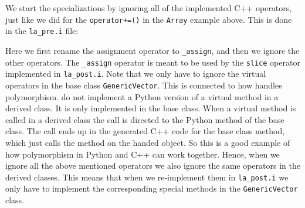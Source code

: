 We start the specializations by ignoring all of the implemented C++ operators, just like we did for the \texttt{operator+=()} in the \texttt{Array} example above. This is done in the \texttt{la\_pre.i} file:
\begin{c++}
\end{c++}
Here we first rename the assignment operator to \texttt{\_assign}, and then we ignore the other operators. The \texttt{\_assign} operator is meant to be used by the \texttt{slice} operator implemented in \texttt{la\_post.i}. Note that we only have to ignore the virtual operators in the base class \texttt{GenericVector}. This is connected to how \swig handles polymorphism. \swig do not implement a Python version of a virtual method in a derived class. It is only implemented in the base class. When a virtual method is called in a derived class the call is directed to the Python method of the base class. The call ends up in the \swig generated C++ code for the base class method, which just calls the method on the handed object. So this is a good example of how polymorphism in Python and C++ can work together. Hence, when we ignore all the above mentioned operators we also ignore the same operators in the derived classes. This means that when we re-implement them in \texttt{la\_post.i} we only have to implement the corresponding special methods in the \texttt{GenericVector} class.\par

